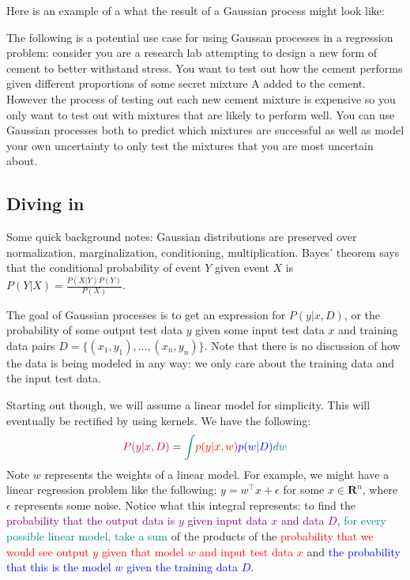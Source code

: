 \documentclass[answers,12pt]{exam}
\begin{document}
Here is an example of a what the result of a Gaussian process might look like:


The following is a potential use case for using Gaussan processes in a regression problem:
consider you are a research lab attempting to design a new form of cement to better withstand stress.
You want to test out how the cement performs given different proportions of some secret mixture A added to the cement.
However the process of testing out each new cement mixture is expensive so you only want to test out with mixtures that are likely to perform well.
You can use Gaussian processes both to predict which mixtures are successful as well as model your own uncertainty to only test the mixtures that you are most uncertain about.


\subsection{Diving in}
Some quick background notes:
Gaussian distributions are preserved over normalization, marginalization, conditioning, multiplication.
Bayes' theorem says that the conditional probability of event $Y$ given event $X$ is $P(Y|X)=\frac{P(X|Y)P(Y)}{P(X)}$.

The goal of Gaussian processes is to get an expression for $P(y|x,D)$, or the probability of some output test data $y$ given some input test data $x$ and training data pairs $D = \{(x_1, y_1), \dots , (x_n,y_n)\}$.
Note that there is no discussion of how the data is being modeled in any way: we only care about the training data and the input test data.

Starting out though, we will assume a linear model for simplicity. 
This will eventually be rectified by using kernels.
We have the following:
\[
    \begin{aligned}
        \textcolor{purple}{P(y|x,D)} = \textcolor{teal}{\int} \textcolor{red}{p(y|x,w)}\textcolor{blue}{p(w|D)}\textcolor{teal}{dw}
    \end{aligned}
\]
Note $w$ represents the weights of a linear model. 
For example, we might have a linear regression problem like the following: $y = w^{\top}x + \epsilon$ for some $x \in \mathbf{R}^n$, where $\epsilon$ represents some noise.
Notice what this integral represents: 
to find the \textcolor{purple}{probability that the output data is $y$ given input data $x$ and data $D$}, \textcolor{teal}{for every possible linear model, take a sum} of the products of the \textcolor{red}{probability that we would see output $y$ given that model $w$ and input test data $x$} and \textcolor{blue}{the probability that this is the model $w$ given the training data $D$}.
\end{document}
